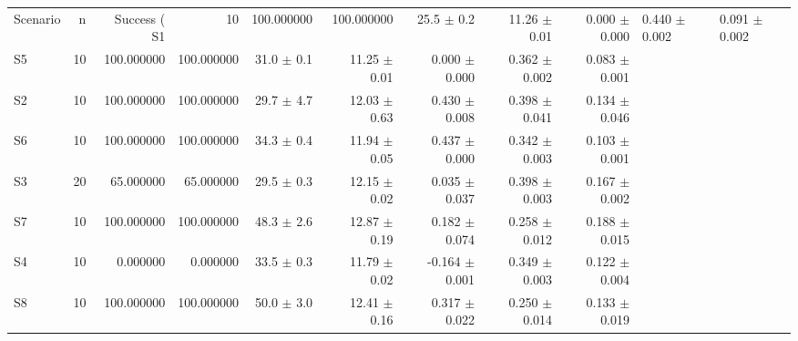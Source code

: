 \begin{tabular}{lrrrrrrrr}
\toprule
Scenario & n & Success (%
\midrule
S1 & 10 & 100.000000 & 100.000000 & 25.5 $\pm$ 0.2 & 11.26 $\pm$ 0.01 & 0.000 $\pm$ 0.000 & 0.440 $\pm$ 0.002 & 0.091 $\pm$ 0.002 \\
S5 & 10 & 100.000000 & 100.000000 & 31.0 $\pm$ 0.1 & 11.25 $\pm$ 0.01 & 0.000 $\pm$ 0.000 & 0.362 $\pm$ 0.002 & 0.083 $\pm$ 0.001 \\
S2 & 10 & 100.000000 & 100.000000 & 29.7 $\pm$ 4.7 & 12.03 $\pm$ 0.63 & 0.430 $\pm$ 0.008 & 0.398 $\pm$ 0.041 & 0.134 $\pm$ 0.046 \\
S6 & 10 & 100.000000 & 100.000000 & 34.3 $\pm$ 0.4 & 11.94 $\pm$ 0.05 & 0.437 $\pm$ 0.000 & 0.342 $\pm$ 0.003 & 0.103 $\pm$ 0.001 \\
S3 & 20 & 65.000000 & 65.000000 & 29.5 $\pm$ 0.3 & 12.15 $\pm$ 0.02 & 0.035 $\pm$ 0.037 & 0.398 $\pm$ 0.003 & 0.167 $\pm$ 0.002 \\
S7 & 10 & 100.000000 & 100.000000 & 48.3 $\pm$ 2.6 & 12.87 $\pm$ 0.19 & 0.182 $\pm$ 0.074 & 0.258 $\pm$ 0.012 & 0.188 $\pm$ 0.015 \\
S4 & 10 & 0.000000 & 0.000000 & 33.5 $\pm$ 0.3 & 11.79 $\pm$ 0.02 & -0.164 $\pm$ 0.001 & 0.349 $\pm$ 0.003 & 0.122 $\pm$ 0.004 \\
S8 & 10 & 100.000000 & 100.000000 & 50.0 $\pm$ 3.0 & 12.41 $\pm$ 0.16 & 0.317 $\pm$ 0.022 & 0.250 $\pm$ 0.014 & 0.133 $\pm$ 0.019 \\
\bottomrule
\end{tabular}
